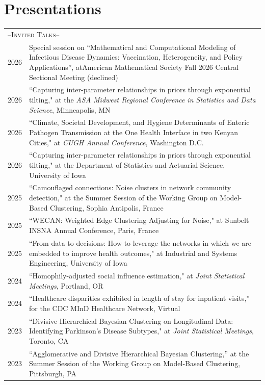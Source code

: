 \documentclass[11pt]{article}
\begin{document}
\section{Presentations}
\vspace{-1pc}
\begin{longtable}{r|p{15.5cm}}
\multicolumn{2}{l}{\large--\textsc{Invited Talks}--\normalsize}\\
2026 & Special session on ``Mathematical and Computational Modeling of Infectious Disease Dynamics: Vaccination, Heterogeneity, and Policy Applications'', atAmerican Mathematical Society Fall 2026 Central Sectional Meeting (declined) \\
2026 & ``Capturing inter-parameter relationships in priors through exponential tilting," at the \textit{ASA Midwest Regional Conference in Statistics and Data Science}, Minneapolis, MN\\
2026 & ``Climate, Societal Development, and Hygiene Determinants of Enteric Pathogen Transmission at the One Health Interface in two Kenyan Cities," at \textit{CUGH Annual Conference},  Washington D.C.\\
2026 & ``Capturing inter-parameter relationships in priors through exponential tilting," at the Department of Statistics and Actuarial Science, University of Iowa\\
2025 & ``Camouflaged connections: Noise clusters in network community detection," at the Summer Session of the Working Group on Model-Based Clustering,  Sophia Antipolis, France\\
2025 & ``WECAN: Weighted Edge Clustering Adjusting for Noise," at Sunbelt INSNA Annual Conference, Paris, France\\
2025 & ``From data to decisions: How to leverage the networks in which we are embedded to improve health outcomes," at Industrial and Systems Engineering, University of Iowa \\
2024 & ``Homophily-adjusted social influence estimation," at {\it Joint Statistical Meetings}, Portland, OR \\
2024 & ``Healthcare disparities exhibited in length of stay for inpatient visits,'' for the CDC MInD Healthcare Network, Virtual \\
2023 & ``Divisive Hierarchical Bayesian Clustering on Longitudinal Data: Identifying Parkinson's Disease Subtypes," at {\it Joint Statistical Meetings}, Toronto, CA \\
2023 & ``Agglomerative and Divisive Hierarchical Bayesian Clustering,'' at the Summer Session of the Working Group on Model-Based Clustering, Pittsburgh, PA \\

\end{longtable}
\end{document}
